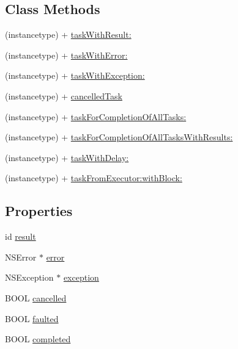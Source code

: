 \subsection*{Class Methods}
\begin{DoxyCompactItemize}
\item 
(instancetype) + \hyperlink{interface_b_f_task_a1a89407ba3e0385c315d394a51e5e1ea}{task\-With\-Result\-:}
\item 
(instancetype) + \hyperlink{interface_b_f_task_af6294f939d1f7391eb8d43019f8d7419}{task\-With\-Error\-:}
\item 
(instancetype) + \hyperlink{interface_b_f_task_ab16e7e6dc835e7bb4cb907564a61d013}{task\-With\-Exception\-:}
\item 
(instancetype) + \hyperlink{interface_b_f_task_ab08b49566c850f4688fad77834310578}{cancelled\-Task}
\item 
(instancetype) + \hyperlink{interface_b_f_task_a6e9060779200dcd7cf065eb7b8369bf4}{task\-For\-Completion\-Of\-All\-Tasks\-:}
\item 
(instancetype) + \hyperlink{interface_b_f_task_ab054e692c68c8e83f73f2f8d6af46bb8}{task\-For\-Completion\-Of\-All\-Tasks\-With\-Results\-:}
\item 
(instancetype) + \hyperlink{interface_b_f_task_a94918174b80126af993dfcb595c78a7b}{task\-With\-Delay\-:}
\item 
(instancetype) + \hyperlink{interface_b_f_task_abb1d5df203902da74b05929e4904fa91}{task\-From\-Executor\-:with\-Block\-:}
\end{DoxyCompactItemize}
\subsection*{Properties}
\begin{DoxyCompactItemize}
\item 
id \hyperlink{interface_b_f_task_a4b748e2af91631b135ca3e324a9fac2e}{result}
\item 
N\-S\-Error $\ast$ \hyperlink{interface_b_f_task_a9e3b5f8fc6e1754500bc7241a04c2cc6}{error}
\item 
N\-S\-Exception $\ast$ \hyperlink{interface_b_f_task_ab21a391a52929bd83d374c32c1b54ebf}{exception}
\item 
B\-O\-O\-L \hyperlink{interface_b_f_task_a0519b52112586cbfcccffca6bade7bc1}{cancelled}
\item 
B\-O\-O\-L \hyperlink{interface_b_f_task_a8b36396022612bbb109bb26e097874be}{faulted}
\item 
B\-O\-O\-L \hyperlink{interface_b_f_task_a8c0d88b65b10e8f6dd5378ad3d9bc6c3}{completed}
\end{DoxyCompactItemize}


